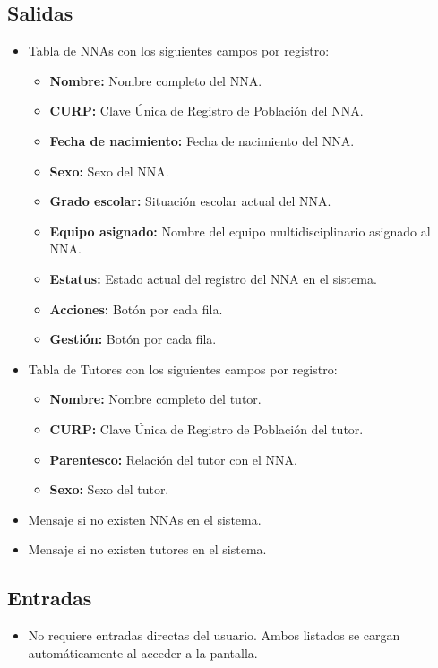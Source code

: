\subsection{Salidas}
\begin{itemize}
	\item Tabla de NNAs con los siguientes campos por registro:
	\begin{itemize}
		\item \textbf{Nombre:} Nombre completo del NNA.
		\item \textbf{CURP:} Clave Única de Registro de Población del NNA.
		\item \textbf{Fecha de nacimiento:} Fecha de nacimiento del NNA.
		\item \textbf{Sexo:} Sexo del NNA.
		\item \textbf{Grado escolar:} Situación escolar actual del NNA.
		\item \textbf{Equipo asignado:} Nombre del equipo multidisciplinario asignado al NNA.
		\item \textbf{Estatus:} Estado actual del registro del NNA en el sistema.
		\item \textbf{Acciones:} Botón  por cada fila.
		\item \textbf{Gestión:} Botón  por cada fila.
	\end{itemize}
	\item Tabla de Tutores con los siguientes campos por registro:
	\begin{itemize}
		\item \textbf{Nombre:} Nombre completo del tutor.
		\item \textbf{CURP:} Clave Única de Registro de Población del tutor.
		\item \textbf{Parentesco:} Relación del tutor con el NNA.
		\item \textbf{Sexo:} Sexo del tutor.
	\end{itemize}
	\item Mensaje  si no existen NNAs en el sistema.
	\item Mensaje  si no existen tutores en el sistema.
\end{itemize}

\subsection{Entradas}
\begin{itemize}
	\item No requiere entradas directas del usuario. Ambos listados se cargan automáticamente al acceder a la pantalla.
\end{itemize}

